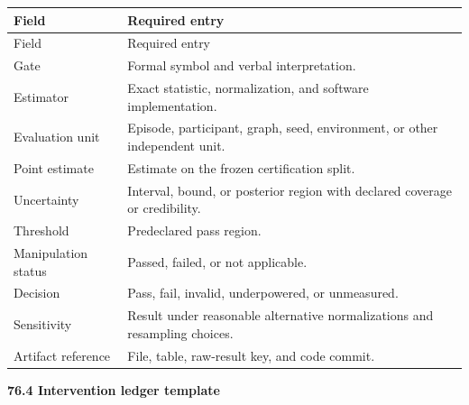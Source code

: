\documentclass[11pt,letterpaper]{article}
\newcommand{\subtopic}[1]{%
 \vspace{0.45em}
 {\bfseries\color{AccentColor} #1\par}
}
\theoremstyle{plain}
\theoremstyle{definition}
\begin{document}
\begin{longtable}{@{}>{\raggedright\arraybackslash}p{}>{\raggedright\arraybackslash}p{}@{}}
\toprule
Field & Required entry \\
\midrule
\endfirsthead
\toprule
Field & Required entry \\
\midrule
\endhead
Gate & Formal symbol and verbal interpretation. \\
Estimator & Exact statistic, normalization, and software implementation. \\
Evaluation unit & Episode, participant, graph, seed, environment, or other
independent unit. \\
Point estimate & Estimate on the frozen certification split. \\
Uncertainty & Interval, bound, or posterior region with declared coverage or
credibility. \\
Threshold & Predeclared pass region. \\
Manipulation status & Passed, failed, or not applicable. \\
Decision & Pass, fail, invalid, underpowered, or unmeasured. \\
Sensitivity & Result under reasonable alternative normalizations and
resampling choices. \\
Artifact reference & File, table, raw-result key, and code commit. \\
\bottomrule
\end{longtable}

\subtopic{76.4 Intervention ledger template}
\end{document}
